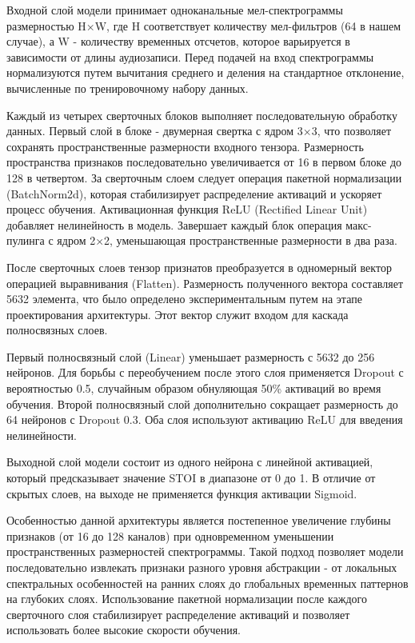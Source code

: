 \documentclass[oneside, final, 14pt]{extarticle}
\begin{document}
Входной слой модели принимает одноканальные мел-спектрограммы размерностью H×W, где H соответствует количеству мел-фильтров (64 в нашем случае), а W - количеству временных отсчетов, которое варьируется в зависимости от длины аудиозаписи. Перед подачей на вход спектрограммы нормализуются путем вычитания среднего и деления на стандартное отклонение, вычисленные по тренировочному набору данных.

Каждый из четырех сверточных блоков выполняет последовательную обработку данных. Первый слой в блоке - двумерная свертка с ядром 3×3, что позволяет сохранять пространственные размерности входного тензора. Размерность пространства признаков последовательно увеличивается от 16 в первом блоке до 128 в четвертом. За сверточным слоем следует операция пакетной нормализации (BatchNorm2d), которая стабилизирует распределение активаций и ускоряет процесс обучения. Активационная функция ReLU (Rectified Linear Unit) добавляет нелинейность в модель. Завершает каждый блок операция макс-пулинга с ядром 2×2, уменьшающая пространственные размерности в два раза.

После сверточных слоев тензор признатов преобразуется в одномерный вектор операцией выравнивания (Flatten). Размерность полученного вектора составляет 5632 элемента, что было определено экспериментальным путем на этапе проектирования архитектуры. Этот вектор служит входом для каскада полносвязных слоев.

Первый полносвязный слой (Linear) уменьшает размерность с 5632 до 256 нейронов. Для борьбы с переобучением после этого слоя применяется Dropout с вероятностью 0.5, случайным образом обнуляющая 50\% активаций во время обучения. Второй полносвязный слой дополнительно сокращает размерность до 64 нейронов с Dropout 0.3. Оба слоя используют активацию ReLU для введения нелинейности.

Выходной слой модели состоит из одного нейрона с линейной активацией, который предсказывает значение STOI в диапазоне от 0 до 1. В отличие от скрытых слоев, на выходе не применяется функция активации Sigmoid.

Особенностью данной архитектуры является постепенное увеличение глубины признаков (от 16 до 128 каналов) при одновременном уменьшении пространственных размерностей спектрограммы. Такой подход позволяет модели последовательно извлекать признаки разного уровня абстракции - от локальных спектральных особенностей на ранних слоях до глобальных временных паттернов на глубоких слоях. Использование пакетной нормализации после каждого сверточного слоя стабилизирует распределение активаций и позволяет использовать более высокие скорости обучения.
\end{document}
